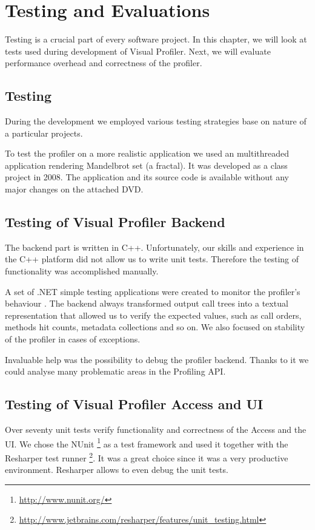 \chapter{Testing and Evaluations}
\label{chap:07TestingEval}
Testing is a crucial part of every software project. In this chapter, we will look at tests used during development of Visual Profiler. Next, we will evaluate performance overhead and correctness of the profiler.

\section{Testing}
During the development we employed various testing strategies base on nature of a particular projects. 

To test the profiler on a more realistic application we used an multithreaded application rendering Mandelbrot set (a fractal). It was developed as a class project in 2008. The application and its source code is available without any major changes on the attached DVD. 

\section{Testing of Visual Profiler Backend}
The backend part is written in C++. Unfortunately, our skills and experience in the C++ platform did not allow us to write unit tests. Therefore the testing of functionality was accomplished manually. 

A set of .NET simple testing applications were created to monitor  the profiler's behaviour . The backend always transformed output call trees into a textual representation that allowed us to verify the expected values, such as call orders, methods hit counts, metadata collections and so on. We also focused on stability of the profiler in cases of exceptions.

Invaluable help was the possibility to debug the profiler backend. Thanks to it we could analyse many problematic areas in the Profiling API.

\section{Testing of Visual Profiler Access and UI}
Over seventy unit tests verify functionality and correctness of the Access and the UI. We chose the NUnit \footnote{\href{http://www.nunit.org/}{http://www.nunit.org/}} as a test framework and used it together with the Resharper test runner \footnote{\href{http://www.jetbrains.com/resharper/features/unit_testing.html}{http://www.jetbrains.com/resharper/features/unit\_testing.html}}. It was a great choice since it was a very productive environment. Resharper allows to even debug the unit tests.

